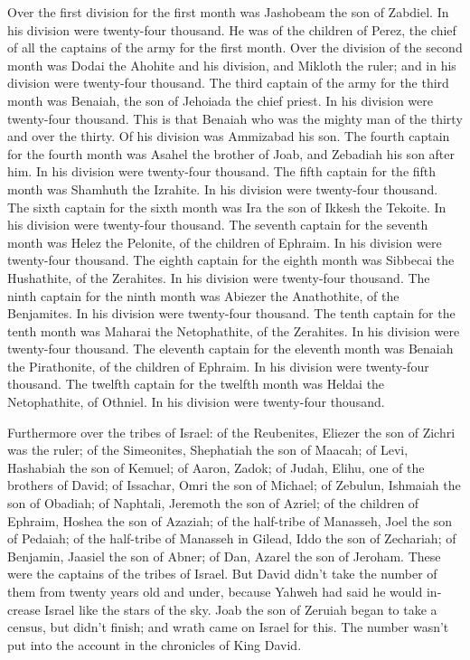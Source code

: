 \begin{paracol}{2}
\begin{otherlanguage}{english}
 Over the first division for the first month was Jashobeam
the son of Zabdiel. In his division were twenty-four thousand.
 He was of the children of Perez, the chief of all the
captains of the army for the first month.  Over the
division of the second month was Dodai the Ahohite and his division, and
Mikloth the ruler; and in his division were twenty-four thousand.
 The third captain of the army for the third month was
Benaiah, the son of Jehoiada the chief priest. In his division were
twenty-four thousand.  This is that Benaiah who was the
mighty man of the thirty and over the thirty. Of his division was
Ammizabad his son.  The fourth captain for the fourth
month was Asahel the brother of Joab, and Zebadiah his son after him. In
his division were twenty-four thousand.  The fifth captain
for the fifth month was Shamhuth the Izrahite. In his division were
twenty-four thousand.  The sixth captain for the sixth
month was Ira the son of Ikkesh the Tekoite. In his division were
twenty-four thousand.  The seventh captain for the
seventh month was Helez the Pelonite, of the children of Ephraim. In his
division were twenty-four thousand.  The eighth captain
for the eighth month was Sibbecai the Hushathite, of the Zerahites. In
his division were twenty-four thousand.  The ninth
captain for the ninth month was Abiezer the Anathothite, of the
Benjamites. In his division were twenty-four thousand. 
The tenth captain for the tenth month was Maharai the Netophathite, of
the Zerahites. In his division were twenty-four thousand.
 The eleventh captain for the eleventh month was Benaiah
the Pirathonite, of the children of Ephraim. In his division were
twenty-four thousand.  The twelfth captain for the
twelfth month was Heldai the Netophathite, of Othniel. In his division
were twenty-four thousand.

 Furthermore over the tribes of Israel: of the
Reubenites, Eliezer the son of Zichri was the ruler; of the Simeonites,
Shephatiah the son of Maacah;  of Levi, Hashabiah the son
of Kemuel; of Aaron, Zadok;  of Judah, Elihu, one of the
brothers of David; of Issachar, Omri the son of Michael; 
of Zebulun, Ishmaiah the son of Obadiah; of Naphtali, Jeremoth the son
of Azriel;  of the children of Ephraim, Hoshea the son of
Azaziah; of the half-tribe of Manasseh, Joel the son of Pedaiah;
 of the half-tribe of Manasseh in Gilead, Iddo the son of
Zechariah; of Benjamin, Jaasiel the son of Abner;  of
Dan, Azarel the son of Jeroham. These were the captains of the tribes of
Israel.  But David didn't take the number of them from
twenty years old and under, because Yahweh had said he would increase
Israel like the stars of the sky.  Joab the son of
Zeruiah began to take a census, but didn't finish; and wrath came on
Israel for this. The number wasn't put into the account in the
chronicles of King David.


\end{otherlanguage}
\end{paracol}
